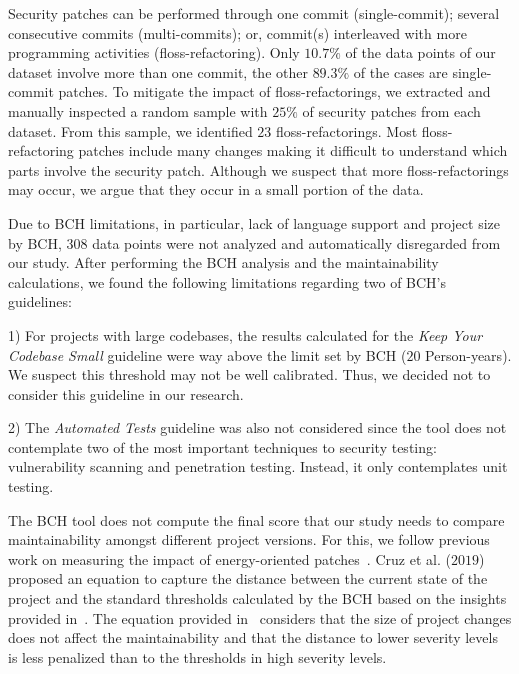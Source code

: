 \documentclass[smallextended]{svjour3}       %
\begin{document}
Security patches can be performed through one commit (single-commit); 
several consecutive commits (multi-commits); or, commit(s) interleaved with more 
programming activities (floss-refactoring). Only $10.7\%$ of the data points 
of our dataset involve more than one commit, the other
$89.3\%$ of the cases are single-commit patches. To mitigate the impact of 
floss-refactorings, we extracted and manually inspected a random sample with 
$25\%$ of security patches from each dataset. From this sample, we identified 
$23$ floss-refactorings. Most floss-refactoring patches include many changes 
making it difficult to understand which parts involve the security patch. 
Although we suspect that more floss-refactorings may occur, we argue that 
they occur in a small portion of the data.

Due to BCH limitations, in particular, lack of language support 
and project size by BCH, $308$ data points were not analyzed and automatically 
disregarded from our study. After performing the BCH analysis and the maintainability calculations, we found the following 
limitations regarding two of BCH's guidelines:

1) For projects with large codebases, the results calculated for 
the \emph{Keep Your Codebase Small} guideline were way above the 
limit set by BCH ($20$ Person-years). We suspect this threshold 
may not be well calibrated. Thus, we decided not to consider 
this guideline in our research. 

2) The 
\emph{Automated Tests} guideline was also not considered since the 
tool does not contemplate two of the most important techniques to 
security testing: vulnerability scanning and penetration testing. 
Instead, it only contemplates unit testing. 


The BCH tool does not compute the final score that our study needs 
to compare maintainability amongst different project versions. For 
this, we follow previous work on measuring the impact of 
energy-oriented patches~\cite{8919169}. Cruz et al. ($2019$) 
proposed an equation to capture the distance between the current 
state of the project and the standard thresholds calculated by the 
BCH based on the insights provided in~\cite{Olivari:2018}. The 
equation provided in~\cite{8919169} considers that the size of 
project changes does not affect the maintainability and that the 
distance to lower severity levels is less penalized than to the
thresholds in high severity levels.
\end{document}
